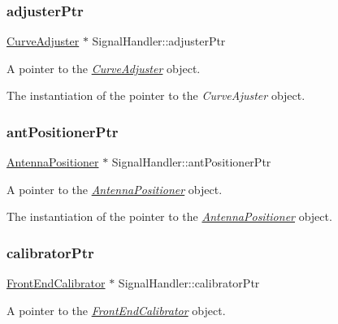 \subsubsection{\texorpdfstring{adjuster\+Ptr}{adjusterPtr}}
{\footnotesize\ttfamily \hyperlink{classCurveAdjuster}{Curve\+Adjuster} $\ast$ Signal\+Handler\+::adjuster\+Ptr\hspace{0.3cm}{\ttfamily [static]}}



A pointer to the {\itshape \hyperlink{classCurveAdjuster}{Curve\+Adjuster}} object. 

The instantiation of the pointer to the {\itshape Curve\+Ajuster} object. \mbox{\label{classSignalHandler_a04f82481d0f5795308e6e2cef7bb0f88}} 
\subsubsection{\texorpdfstring{ant\+Positioner\+Ptr}{antPositionerPtr}}
{\footnotesize\ttfamily \hyperlink{classAntennaPositioner}{Antenna\+Positioner} $\ast$ Signal\+Handler\+::ant\+Positioner\+Ptr\hspace{0.3cm}{\ttfamily [static]}}



A pointer to the {\itshape \hyperlink{classAntennaPositioner}{Antenna\+Positioner}} object. 

The instantiation of the pointer to the {\itshape \hyperlink{classAntennaPositioner}{Antenna\+Positioner}} object. \mbox{\label{classSignalHandler_ae5bbe309adfefeb3b7e9ebf31d32b763}} 
\subsubsection{\texorpdfstring{calibrator\+Ptr}{calibratorPtr}}
{\footnotesize\ttfamily \hyperlink{classFrontEndCalibrator}{Front\+End\+Calibrator} $\ast$ Signal\+Handler\+::calibrator\+Ptr\hspace{0.3cm}{\ttfamily [static]}}



A pointer to the {\itshape \hyperlink{classFrontEndCalibrator}{Front\+End\+Calibrator}} object. 

